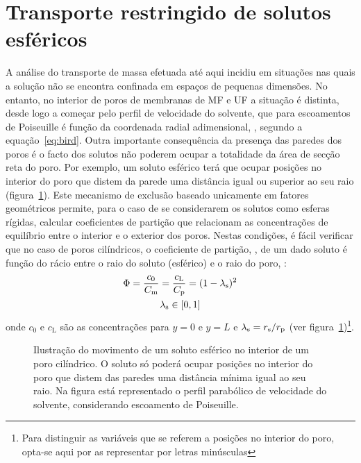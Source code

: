 \section{Transporte restringido de solutos esféricos} %
\label{sec:restringido}
A análise do transporte de massa efetuada até aqui incidiu em situações nas quais a solução não se encontra confinada em espaços de pequenas dimensões. No entanto, no interior de poros de membranas de MF e UF a situação é distinta, desde logo a começar pelo perfil de velocidade do solvente, que para escoamentos de Poiseuille é função da coordenada radial adimensional, \radialadimensional, segundo a equação~\ref{eq:bird}. 
Outra importante consequência da presença das paredes dos poros é o facto dos solutos não poderem ocupar a totalidade da área de secção reta do poro. Por exemplo, um soluto esférico terá que ocupar posições no interior do poro que distem da parede uma distância igual ou superior ao seu raio (figura~\ref{fig:modelohindered}). Este mecanismo de exclusão baseado unicamente em fatores geométricos permite, para o caso de se considerarem os solutos como esferas rígidas, calcular coeficientes de partição que relacionam as concentrações de equilíbrio entre o interior e o exterior dos poros. 
Nestas condições, é fácil verificar que no caso de poros cilíndricos, o coeficiente de partição, \particao, de um dado soluto é função do rácio entre o raio do soluto (esférico) e o raio do poro, \lambdas:
\begin{equation}
\label{eq:particaohs}
\begin{gathered}
\Phi =  \frac{c_0}{C_{\mathrm{m}}}=\frac{c_{\mathrm{L}}}{C_{\mathrm{p}}}=(1-\lambda_{\mathrm{s}})^2 \\
\lambda_{\mathrm{s}} \in  [0, 1]
\end{gathered}
\end{equation}  
onde $c_0$ e $c_{\mathrm{L}}$ são as concentrações para $y=0$ e $y=L$ e $\lambda_{\mathrm{s}}=r_{\mathrm{s}}/r_{\mathrm{p}}$ (ver figura~\ref{fig:modelohindered})\footnote{Para distinguir as variáveis que se referem a posições no interior do poro, opta-se aqui por as representar por letras minúsculas}. 
\begin{figure}
	\centering
	
	\caption[Soluto esférico no interior de um poro cilíndrico]{Ilustração do movimento de um soluto esférico no interior de um poro cilíndrico. O soluto só poderá ocupar posições no interior do poro que distem das paredes uma distância mínima igual ao seu raio. Na figura está representado o perfil parabólico de velocidade do solvente, considerando escoamento de Poiseuille.} 
	\label{fig:modelohindered}
\end{figure}
